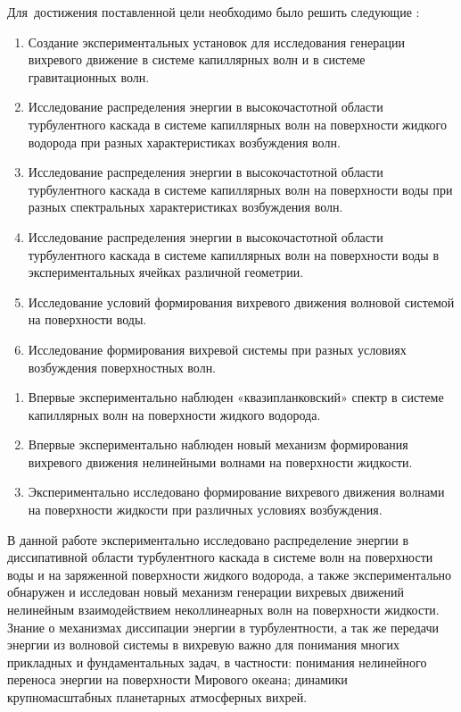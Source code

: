 Для~достижения поставленной цели необходимо было решить следующие {\tasks}:
\begin{enumerate}
	\item Создание экспериментальных установок для исследования генерации вихревого движение в системе капиллярных волн и в системе гравитационных волн.
	\item Исследование распределения энергии в высокочастотной области турбулентного каскада в системе капиллярных волн на поверхности жидкого водорода при разных характеристиках возбуждения волн.
	\item Исследование распределения энергии в высокочастотной области турбулентного каскада в системе капиллярных волн на поверхности воды при разных спектральных характеристиках возбуждения волн.
	\item Исследование распределения энергии в высокочастотной области турбулентного каскада в системе капиллярных волн на поверхности воды в экспериментальных ячейках различной геометрии.
	\item Исследование условий формирования вихревого движения волновой системой на поверхности воды.
	\item Исследование формирования вихревой системы при разных условиях
возбуждения поверхностных волн.
\end{enumerate}

{\novelty}
\begin{enumerate}
	\item Впервые экспериментально наблюден «квазипланковский» спектр в системе капиллярных волн на поверхности жидкого водорода.
	\item Впервые экспериментально наблюден новый механизм формирования вихревого движения нелинейными волнами на поверхности жидкости.
	\item Экспериментально исследовано формирование вихревого движения волнами на поверхности жидкости при различных условиях возбуждения.
	
\end{enumerate}

{\influence}

В данной работе экспериментально исследовано распределение энергии в диссипативной области турбулентного каскада в системе волн на поверхности воды и на заряженной поверхности жидкого водорода, а также экспериментально обнаружен и исследован новый механизм генерации вихревых движений нелинейным взаимодействием неколлинеарных волн на поверхности жидкости. Знание о механизмах диссипации энергии в турбулентности, а так же передачи энергии из волновой системы в вихревую важно для понимания многих прикладных и фундаментальных задач, в частности: понимания нелинейного переноса энергии на поверхности Мирового океана; динамики крупномасштабных планетарных атмосферных вихрей.


